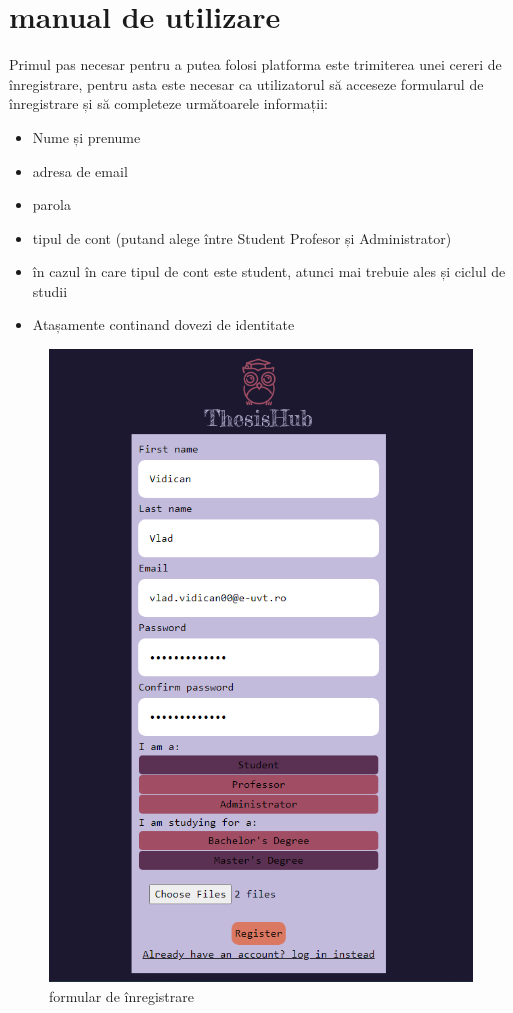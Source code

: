 \documentclass[12pt,a4paper,hidelinks]{report}
\theoremstyle{definition}
\theoremstyle{remark}
\begin{document}
\section{manual de utilizare}
Primul pas necesar pentru a putea folosi platforma este trimiterea unei cereri de înregistrare, pentru asta este necesar
ca utilizatorul să acceseze formularul de înregistrare și să completeze următoarele informații:
\begin{itemize}
    \item Nume și prenume
    \item adresa de email
    \item parola
    \item tipul de cont (putand alege între Student Profesor și Administrator)
    \item în cazul în care tipul de cont este student, atunci mai trebuie ales și ciclul de studii
    \item Atașamente continand dovezi de identitate
\end{itemize}
\begin{figure}[H]
    \centering
    \includegraphics[scale=0.5]{images/RegisterForm.png}
    \caption{formular de înregistrare}
\end{figure}
\end{document}
